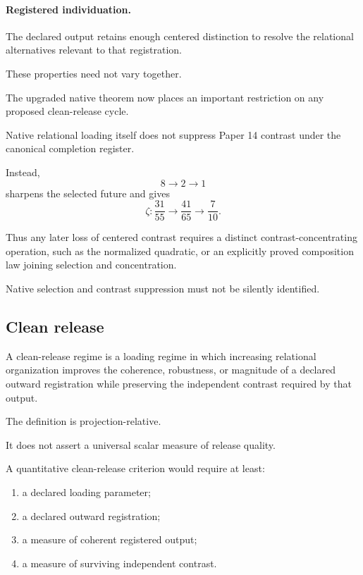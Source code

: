 \paragraph{Registered individuation.}
The declared output retains enough centered distinction to resolve the
relational alternatives relevant to that registration.

These properties need not vary together.

The upgraded native theorem now places an important restriction on any
proposed clean-release cycle.

Native relational loading itself does not suppress Paper 14 contrast
under the canonical completion register.

Instead,
\[
8\longrightarrow2\longrightarrow1
\]
sharpens the selected future and gives
\[
\zeta:
\frac{31}{55}
\longrightarrow
\frac{41}{65}
\longrightarrow
\frac{7}{10}.
\]

Thus any later loss of centered contrast requires a distinct
contrast-concentrating operation, such as the normalized quadratic,
or an explicitly proved composition law joining selection and
concentration.

Native selection and contrast suppression must not be silently
identified.

\subsection{Clean release}

\begin{definition}
A clean-release regime is a loading regime in which increasing
relational organization improves the coherence, robustness, or
magnitude of a declared outward registration while preserving the
independent contrast required by that output.
\end{definition}

The definition is projection-relative.

It does not assert a universal scalar measure of release quality.

A quantitative clean-release criterion would require at least:

\begin{enumerate}[label=(\roman*)]

\item a declared loading parameter;

\item a declared outward registration;

\item a measure of coherent registered output;

\item a measure of surviving independent contrast.

\end{enumerate}

